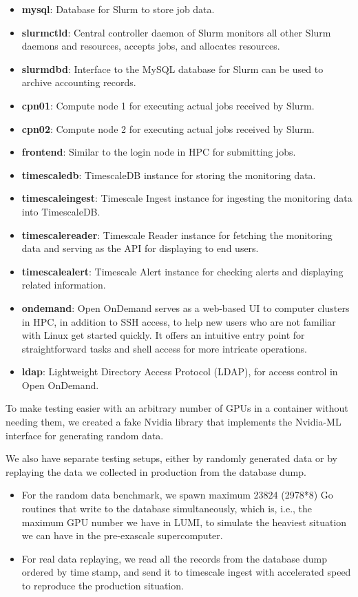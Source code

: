 \begin{itemize}
    \item \textbf{mysql}: Database for Slurm to store job data.
    \item \textbf{slurmctld}: Central controller daemon of Slurm monitors all other Slurm daemons and resources, accepts jobs, and allocates resources.
    \item \textbf{slurmdbd}: Interface to the MySQL database for Slurm can be used to archive accounting records.
    \item \textbf{cpn01}: Compute node 1 for executing actual jobs received by Slurm.
    \item \textbf{cpn02}: Compute node 2 for executing actual jobs received by Slurm.
    \item \textbf{frontend}: Similar to the login node in HPC for submitting jobs.
    \item \textbf{timescaledb}: TimescaleDB instance for storing the monitoring data.
    \item \textbf{timescaleingest}: Timescale Ingest instance for ingesting the monitoring data into TimescaleDB.
    \item \textbf{timescalereader}: Timescale Reader instance for fetching the monitoring data and serving as the API for displaying to end users.
    \item \textbf{timescalealert}: Timescale Alert instance for checking alerts and displaying related information.
    \item \textbf{ondemand}: Open OnDemand serves as a web-based UI to computer clusters in HPC, in addition to SSH access, to help new users who are not familiar with Linux get started quickly. It offers an intuitive entry point for straightforward tasks and shell access for more intricate operations.
    \item \textbf{ldap}: Lightweight Directory Access Protocol (LDAP), for access control in Open OnDemand.
\end{itemize}

To make testing easier with an arbitrary number of GPUs in a container without needing them, we created a fake Nvidia library that implements the Nvidia-ML interface for generating random data.

We also have separate testing setups, either by randomly generated data or by replaying the data we collected in production from the database dump.

\begin{itemize}
    \item For the random data benchmark, we spawn maximum 23824 (2978*8) Go routines that write to the database simultaneously, which is, i.e., the maximum GPU number we have in LUMI, to simulate the heaviest situation we can have in the pre-exascale supercomputer.
    \item For real data replaying, we read all the records from the database dump ordered by time stamp, and send it to timescale ingest with accelerated speed to reproduce the production situation.
\end{itemize}

